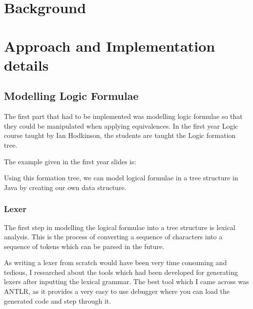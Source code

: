 \documentclass{report}
\begin{document}

\chapter{Background} %


\chapter{Approach and Implementation details}

\section{Modelling Logic Formulae}

The first part that had to be implemented was modelling logic formulae so that
they could be manipulated when applying equivalences. In the first year Logic course
taught by Ian Hodkinson, the students are taught the Logic formation tree.

The example given in the first year slides is:

Using this formation tree, we can model logical formulae in a tree structure in
Java by creating our own data structure.

\subsection{Lexer}

The first step in modelling the logical formulae into a tree structure is lexical 
analysis. This is the process of converting a sequence of characters into a sequence
of tokens which can be parsed in the future.

As writing a lexer from scratch would have been very time consuming and tedious,
I researched about the tools which had been developed for generating lexers after
inputting the lexical grammar. The best tool which I came across was ANTLR, as it
provides a very easy to use debugger where you can load the generated code and step
through it. 
\end{document}
